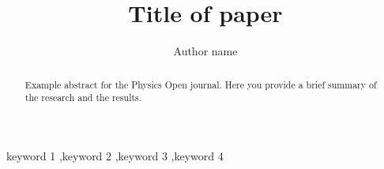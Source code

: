 \documentclass[final,5p,times,twocolumn,authoryear]{elsarticle}
\begin{document}
\begin{frontmatter}



\title{Title of paper}


\author[first]{Author name}

\begin{abstract}
Example abstract for the Physics Open journal. Here you provide a brief summary of the research and the results.
\end{abstract}



\begin{keyword}
keyword 1 \sep keyword 2 \sep keyword 3 \sep keyword 4



\end{keyword}


\end{frontmatter}
\end{document}
